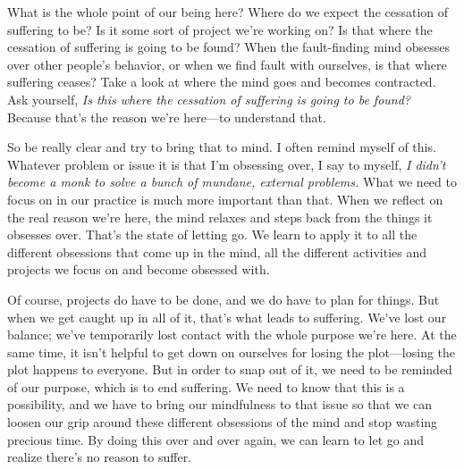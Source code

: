 
What is the whole point of our being here? Where do we expect the 
cessation of suffering to be? Is it some sort of project we're working 
on? Is that where the cessation of suffering is going to be found? When 
the fault-finding mind obsesses over other people's behavior, or when 
we find fault with ourselves, is that where suffering ceases? Take a 
look at where the mind goes and becomes contracted. Ask yourself, 
\emph{Is this where the cessation of suffering is going to be found?} 
Because that's the reason we're here---to understand that.

So be really clear and try to bring that to mind. I often remind myself 
of this. Whatever problem or issue it is that I'm obsessing over, I say 
to myself, \emph{I didn't become a monk to solve a bunch of mundane, 
external problems.} What we need to focus on in our practice is much 
more important than that. When we reflect on the real reason we're 
here, the mind relaxes and steps back from the things it obsesses over. 
That's the state of letting go. We learn to apply it to all the 
different obsessions that come up in the mind, all the different 
activities and projects we focus on and become obsessed with.

Of course, projects do have to be done, and we do have to plan for 
things. But when we get caught up in all of it, that's what leads to 
suffering. We've lost our balance; we've temporarily lost contact with 
the whole purpose we're here. At the same time, it isn't helpful to get 
down on ourselves for losing the plot---losing the plot happens to 
everyone. But in order to snap out of it, we need to be reminded of our 
purpose, which is to end suffering. We need to know that this is a 
possibility, and we have to bring our mindfulness to that issue so that 
we can loosen our grip around these different obsessions of the mind 
and stop wasting precious time. By doing this over and over again, we 
can learn to let go and realize there's no reason to suffer.

